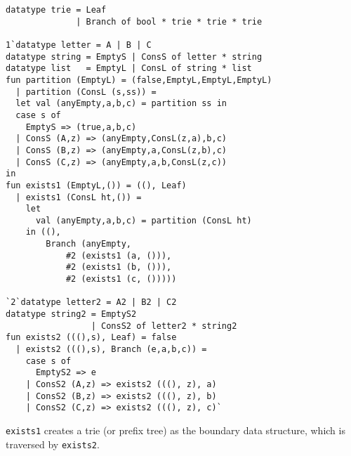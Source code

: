 \begin{lstlisting} 
datatype trie = Leaf 
			  | Branch of bool * trie * trie * trie

1`datatype letter = A | B | C 
datatype string = EmptyS | ConsS of letter * string
datatype list   = EmptyL | ConsL of string * list
fun partition (EmptyL) = (false,EmptyL,EmptyL,EmptyL) 
  | partition (ConsL (s,ss)) = 
  let val (anyEmpty,a,b,c) = partition ss in 
  case s of 
    EmptyS => (true,a,b,c) 
  | ConsS (A,z) => (anyEmpty,ConsL(z,a),b,c) 
  | ConsS (B,z) => (anyEmpty,a,ConsL(z,b),c) 
  | ConsS (C,z) => (anyEmpty,a,b,ConsL(z,c)) 
in
fun exists1 (EmptyL,()) = ((), Leaf)
  | exists1 (ConsL ht,()) =
	let 
	  val (anyEmpty,a,b,c) = partition (ConsL ht) 
	in ((), 
		Branch (anyEmpty, 
			#2 (exists1 (a, ())), 
			#2 (exists1 (b, ())), 
			#2 (exists1 (c, ()))))

`2`datatype letter2 = A2 | B2 | C2
datatype string2 = EmptyS2 
                 | ConsS2 of letter2 * string2
fun exists2 (((),s), Leaf) = false
  | exists2 (((),s), Branch (e,a,b,c)) = 
    case s of
	  EmptyS2 => e
	| ConsS2 (A,z) => exists2 (((), z), a)
	| ConsS2 (B,z) => exists2 (((), z), b)
	| ConsS2 (C,z) => exists2 (((), z), c)`

\end{lstlisting}

\texttt{exists1} creates a trie (or prefix tree) as the boundary data structure,
which is traversed by \texttt{exists2}.

